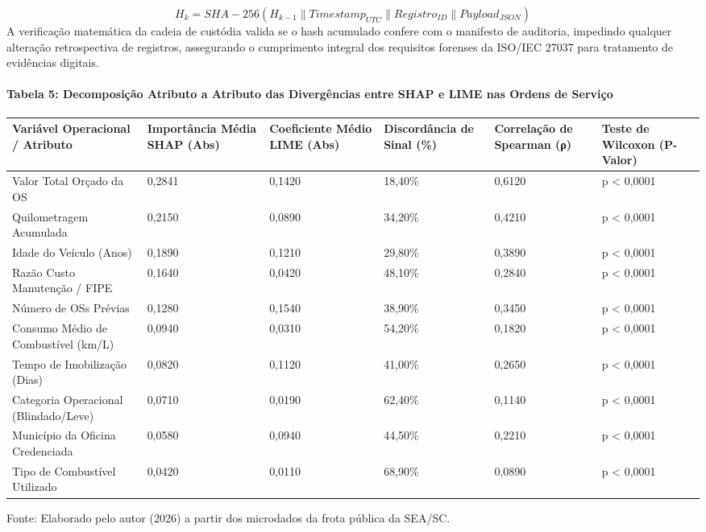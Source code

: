 \documentclass[10pt,a4paper,journal]{article}
\begin{document}
\begin{equation}
H_{k} = SHA-256( H_{k-1} \parallel Timestamp_{UTC} \parallel Registro_{ID} \parallel Payload_{JSON} ) \label{eq:8}
\end{equation}
A verificação matemática da cadeia de custódia valida se o hash acumulado confere com o manifesto de auditoria, impedindo qualquer alteração retrospectiva de registros, assegurando o cumprimento integral dos requisitos forenses da ISO/IEC 27037 para tratamento de evidências digitais.

\paragraph{Tabela 5: Decomposição Atributo a Atributo das Divergências entre SHAP e LIME nas Ordens de Serviço}
\begin{table}[htbp]
\centering
\small
\begin{tabular}{llllll}
\toprule
Variável Operacional / Atributo & Importância Média SHAP (Abs) & Coeficiente Médio LIME (Abs) & Discordância de Sinal (\%) & Correlação de Spearman (ρ) & Teste de Wilcoxon (P-Valor) \\
\midrule
Valor Total Orçado da OS & 0,2841 & 0,1420 & 18,40\% & 0,6120 & p < 0,0001 \\
Quilometragem Acumulada & 0,2150 & 0,0890 & 34,20\% & 0,4210 & p < 0,0001 \\
Idade do Veículo (Anos) & 0,1890 & 0,1210 & 29,80\% & 0,3890 & p < 0,0001 \\
Razão Custo Manutenção / FIPE & 0,1640 & 0,0420 & 48,10\% & 0,2840 & p < 0,0001 \\
Número de OSs Prévias & 0,1280 & 0,1540 & 38,90\% & 0,3450 & p < 0,0001 \\
Consumo Médio de Combustível (km/L) & 0,0940 & 0,0310 & 54,20\% & 0,1820 & p < 0,0001 \\
Tempo de Imobilização (Dias) & 0,0820 & 0,1120 & 41,00\% & 0,2650 & p < 0,0001 \\
Categoria Operacional (Blindado/Leve) & 0,0710 & 0,0190 & 62,40\% & 0,1140 & p < 0,0001 \\
Município da Oficina Credenciada & 0,0580 & 0,0940 & 44,50\% & 0,2210 & p < 0,0001 \\
Tipo de Combustível Utilizado & 0,0420 & 0,0110 & 68,90\% & 0,0890 & p < 0,0001 \\
\bottomrule
\end{tabular}
\end{table}
Fonte: Elaborado pelo autor (2026) a partir dos microdados da frota pública da SEA/SC.
\end{document}

